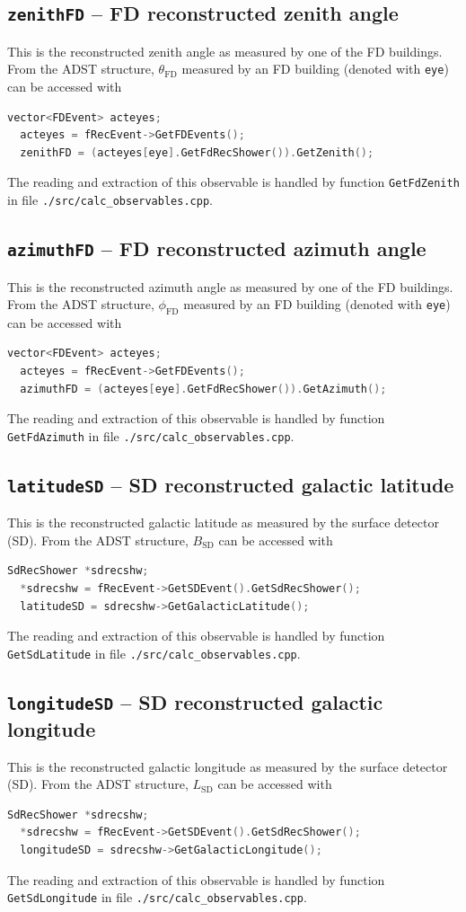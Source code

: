 \documentclass[12pt,a4paper]{report}
\begin{document}
\subsection{\texttt{zenithFD} -- FD reconstructed zenith angle}
This is the reconstructed zenith angle as measured by one of the FD buildings. From the ADST structure, $\theta_{\textrm{FD}}$ measured by an FD building (denoted with \texttt{eye}) can be accessed with
\begin{lstlisting}[language=C++]
  vector<FDEvent> acteyes;
  acteyes = fRecEvent->GetFDEvents();
  zenithFD = (acteyes[eye].GetFdRecShower()).GetZenith();
\end{lstlisting}
The reading and extraction of this observable is handled by function \texttt{GetFdZenith} in file \texttt{./src/calc\_observables.cpp}.

\subsection{\texttt{azimuthFD} -- FD reconstructed azimuth angle}
This is the reconstructed azimuth angle as measured by one of the FD buildings. From the ADST structure, $\phi_{\textrm{FD}}$ measured by an FD building (denoted with \texttt{eye}) can be accessed with
\begin{lstlisting}[language=C++]
  vector<FDEvent> acteyes;
  acteyes = fRecEvent->GetFDEvents();
  azimuthFD = (acteyes[eye].GetFdRecShower()).GetAzimuth();
\end{lstlisting}
The reading and extraction of this observable is handled by function \texttt{GetFdAzimuth} in file \texttt{./src/calc\_observables.cpp}.

\subsection{\texttt{latitudeSD} -- SD reconstructed galactic latitude}
This is the reconstructed galactic latitude as measured by the surface detector (SD). From the ADST structure, $B_{\textrm{SD}}$ can be accessed with
\begin{lstlisting}[language=C++]
  SdRecShower *sdrecshw;
  *sdrecshw = fRecEvent->GetSDEvent().GetSdRecShower();
  latitudeSD = sdrecshw->GetGalacticLatitude();
\end{lstlisting}
The reading and extraction of this observable is handled by function \texttt{GetSdLatitude} in file \texttt{./src/calc\_observables.cpp}.

\subsection{\texttt{longitudeSD} -- SD reconstructed galactic longitude}
This is the reconstructed galactic longitude as measured by the surface detector (SD). From the ADST structure, $L_{\textrm{SD}}$ can be accessed with
\begin{lstlisting}[language=C++]
  SdRecShower *sdrecshw;
  *sdrecshw = fRecEvent->GetSDEvent().GetSdRecShower();
  longitudeSD = sdrecshw->GetGalacticLongitude();
\end{lstlisting}
The reading and extraction of this observable is handled by function \texttt{GetSdLongitude} in file \texttt{./src/calc\_observables.cpp}.
\end{document}
